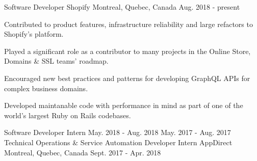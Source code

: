 

\begin{cventries}

  \cventry
  {\small Software Developer} %
  {\normalsize Shopify} %
  {\small Montreal, Quebec, Canada} %
  {\small Aug. 2018 - present} %
    {
      \vspace{3mm}
      \begin{cvitems} %
      \item \small Contributed to product features, infrastructure reliability and large refactors to Shopify's platform.
      \item \small Played a significant role as a contributor to many projects in the Online Store, Domains \& SSL teams' roadmap.
      \item \small Encouraged new best practices and patterns for developing GraphQL APIs for complex business domains.
      \item \small Developed maintanable code with performance in mind as part of one of the world's largest Ruby on Rails codebases.
      \end{cvitems}
    }
\vspace{-21mm}
  \cventry
  {\small Software Developer Intern} %
  {} %
  {} %
  {\small May. 2018 - Aug. 2018} %
    {
    }
\vspace{-5mm}
  \cventry
  {} %
  {} %
  {} %
  {\small May. 2017 - Aug. 2017} %
    {
    }
\vspace{12mm}
  \cventry
  {\small Technical Operations \& Service Automation Developer Intern} %
  {\normalsize AppDirect} %
  {\small Montreal, Quebec, Canada} %
  {\small Sept. 2017 - Apr. 2018 } %
    {
      \begin{cvitems} %

\end{cvitems}}
\end{cventries}
